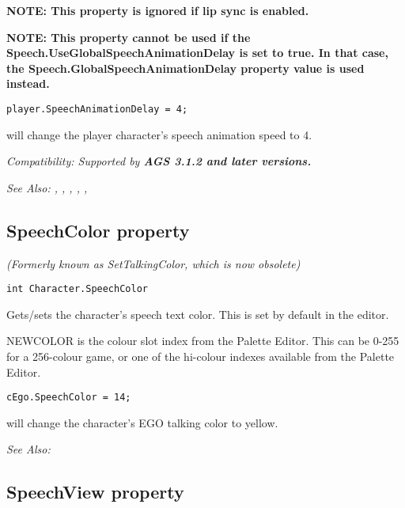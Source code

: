 \bf{NOTE:} This property is ignored if lip sync is enabled.

\bf{NOTE:} This property \bf{cannot} be used if the Speech.UseGlobalSpeechAnimationDelay is set to \bf{true}. In that case, the Speech.GlobalSpeechAnimationDelay property value is used instead.

\begin{verbatim}
player.SpeechAnimationDelay = 4;
\end{verbatim}
will change the player character's speech animation speed to 4.

\it{Compatibility:} Supported by \bf{AGS 3.1.2} and later versions.

\it{See Also:} ,
,
,
,
,


\subsection{SpeechColor property}\label{Character.SpeechColor}%

\it{(Formerly known as SetTalkingColor, which is now obsolete)}

\begin{verbatim}
int Character.SpeechColor
\end{verbatim}
Gets/sets the character's speech text color. This is set by default in the
editor.

NEWCOLOR is the colour slot index from the Palette Editor. This can be 0-255 for
a 256-colour game, or one of the hi-colour indexes available from the Palette Editor.

\begin{verbatim}
cEgo.SpeechColor = 14;
\end{verbatim}
will change the character's EGO talking color to yellow.

\it{See Also:} 


\subsection{SpeechView property}\label{Character.SpeechView}%

